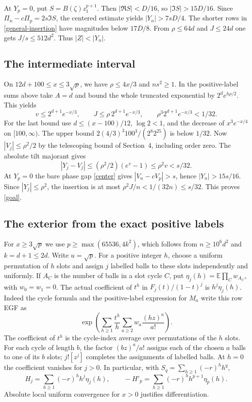 At \(Y_p=0\), put \(S=B(\zeta) z_1^{p+1}\).
Then \(|\Re S|<D/16\), so \(|\Im S|>15D/16\). Since
\(\Pi_n-c\Pi_p=2s\Im S\), the centered estimate yields
\(|Y_n|>7sD/4\). The shorter rows in \eqref{general-insertion}
have magnitudes below \(17D/8\). From \(\rho\le64d\) and
\(J\le24d\) one gets \(J/s\le512d^2\). Thus \(|Z|<|Y_n|\).

\subsection{The intermediate interval}
On \(12d+100\le x\le3\sqrt p\), we have \(\rho\le4x/3\) and
\(ns^2\ge1\). In the positive-label sums above take \(A=d\) and
bound the whole truncated exponential by \(2^d e^{h\rho/2}\).
This yields
\[
 v\le2^{d+1}e^{-x/3},\qquad J\le\rho\,2^{d+1}e^{-x/3},\qquad
 \rho^3 2^{d+1}e^{-x/3}<1/32 .
\]
For the last bound use \(d\le(x-100)/12\), \(\log2<1\), and the
decrease of \(x^3e^{-x/4}\) on \([100,\infty)\).
The upper bound \(2(4/3)^3 100^3/(2^8 2^{25})\) is below \(1/32\).
Now \(|V_j|\le\rho^2/2\) by the telescoping bound of Section~4,
including order zero. The absolute tilt majorant gives
\[
 |Y_j-V_j|\le (\rho^2/2)(e^v-1)\le\rho^2v<s/32 .
\]
At \(Y_p=0\) the bare phase gap \eqref{center} gives
\(|V_n-cV_p|>s\), hence \(|Y_n|>15s/16\).
Since \(|Y_j|\le\rho^2\), the insertion is at most
\(\rho^2J/n<1/(32n)\le s/32\). This proves \eqref{goal}.

\subsection{The exterior from the exact positive labels}
For \(x\ge3\sqrt p\) we use \(p\ge\max(65536,4k^2)\), which
follows from \(n\ge10^6d^2\) and \(k=d+1\le2d\).
Write \(u=\sqrt p\). For a positive integer \(h\), choose a uniform
permutation of \(h\) slots and assign \(j\) labelled balls to these
slots independently and uniformly. If \(A_C\) is the number of
balls in a slot cycle \(C\), put \(\eta_j(h)=\mathbb{E}\prod_C w_{A_C}\),
with \(w_0=w_1=0\). The actual coefficient of \(t^h\) in
\(F_j(t)/(1-t)^j\) is \(h^j\eta_j(h)\). Indeed the cycle formula and
the positive-label expression for \(M_a\) write this row EGF as
\[
 \exp\!\left(\sum_{h\ge1}\frac{t^h}{h}
                   \sum_{a\ge2}w_a \frac{(hz)^a}{a!}\right).
\]
The coefficient of \(t^h\) is the cycle-index average over permutations
of the \(h\) slots. For each cycle of length \(b\), the factor
\((bz)^a/a!\) assigns each of the chosen \(a\) balls to one of its \(b\) slots;
\(j![z^j]\) completes the assignments of labelled balls.
At \(h=0\) the coefficient vanishes for \(j>0\).
In particular, with \(S_q=\sum_{h\ge1}(-r)^h h^q\),
\[
 H_j=\sum_{h\ge1}(-r)^h h^j\eta_j(h),\qquad
 -H'_p=\sum_{h\ge1}(-r)^h h^{p+1}\eta_p(h).
\]
Absolute local uniform convergence for \(x>0\) justifies differentiation.

